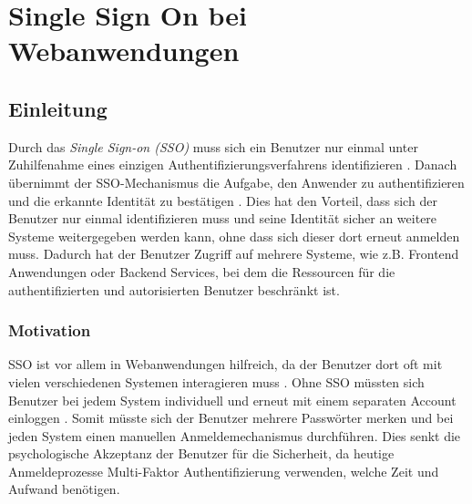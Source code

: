 

\chapter{Single Sign On bei Webanwendungen}



\section{Einleitung} \label{EB_Einleitung}

Durch das \textit{Single Sign-on (SSO)} muss sich ein Benutzer nur einmal unter Zuhilfenahme eines einzigen Authentifizierungsverfahrens identifizieren \cite{EB52}. Danach übernimmt der SSO-Mechanismus die Aufgabe, den Anwender zu authentifizieren und die erkannte Identität zu bestätigen \cite{EB52}. Dies hat den Vorteil, dass sich der Benutzer nur einmal identifizieren muss und seine Identität sicher an weitere Systeme weitergegeben werden kann, ohne dass sich dieser dort erneut anmelden muss. Dadurch hat der Benutzer Zugriff auf mehrere Systeme, wie z.B. Frontend Anwendungen oder Backend Services, bei dem die Ressourcen für die authentifizierten und autorisierten Benutzer beschränkt ist.

\subsection{Motivation}


SSO ist vor allem in Webanwendungen hilfreich, da der Benutzer dort oft mit vielen verschiedenen Systemen interagieren muss \cite{EB34}. Ohne SSO müssten sich Benutzer bei jedem System individuell und erneut mit einem separaten Account einloggen \cite{EB34}. Somit müsste sich der Benutzer mehrere Passwörter merken und bei jeden System einen manuellen Anmeldemechanismus durchführen. Dies senkt die psychologische Akzeptanz der Benutzer für die Sicherheit, da heutige Anmeldeprozesse Multi-Faktor Authentifizierung verwenden, welche Zeit und Aufwand benötigen.

